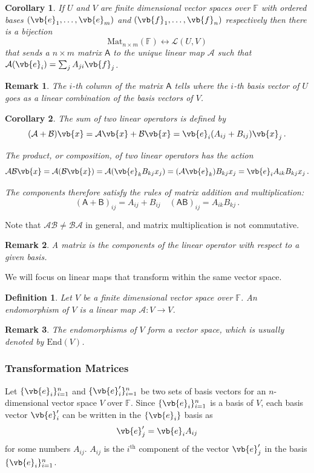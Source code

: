 \documentclass{article}
\theoremstyle{plain}\theoremheaderfont{\normalfont\itshape}\theorembodyfont{\rmfamily}\theoremseparator{.}\newtheorem*{rem}{Remark}\newtheorem*{ex}{Example}\newtheorem*{proof}{Proof}\newtheorem*{altp}{Alternative proof}
\theoremstyle{plain}\theoremheaderfont{\normalfont\bfseries}\theorembodyfont{\rmfamily}\theoremseparator{.}\newtheorem{thm}{Theorem}[section]\newtheorem{lem}[thm]{Lemma}\newtheorem{prop}[thm]{Proposition}\newtheorem*{cor}{Corollary}\newtheorem{defn}[thm]{Definition}\newtheorem{clm}[thm]{Claim}\newtheorem{clminproof}{Claim}
\theoremstyle{break}\theoremheaderfont{\normalfont\itshape}\theorembodyfont{\rmfamily}\theoremseparator{.\medskip}\newtheorem*{proofskip}{Proof}\newtheorem*{exs}{Examples}\newtheorem*{rems}{Remarks}
\theoremstyle{break}\theoremheaderfont{\normalfont\bfseries}\theorembodyfont{\rmfamily}\theoremseparator{.\medskip}\newtheorem{lemskip}[thm]{Lemma}\newtheorem{defnskip}[thm]{Definition}\newtheorem{propskip}[thm]{Proposition}\newtheorem{thmskip}[thm]{Theorem}
\numberwithin{equation}{section}
\begin{document}
	\begin{cor}
		If \(U\) and \(V\) are finite dimensional vector spaces over \(\mathbb{F}\) with ordered bases \((\vb{e}_1,\dots,\vb{e}_m)\) and \((\vb{f}_1,\dots,\vb{f}_n)\) respectively then there is a bijection
		\[\mathrm{Mat}_{n\times m}(\mathbb{F})\leftrightarrow \mathcal{L}(U,V)\]
		that sends a \(n\times m\) matrix \(\mathsf{A}\) to the unique linear map \(\mathcal{A}\) such that \(\mathcal{A}(\vb{e}_i) = \sum_j A_{ji}\vb{f}_j\).		
	\end{cor}
	\begin{rem}
		The \(i\)-th column of the matrix \(\mathsf{A}\) tells where the \(i\)-th basis vector of \(U\) goes as a linear combination of the basis vectors of \(V\).
	\end{rem}
	\begin{cor}
		The sum of two linear operators is defined by
		\[(\mathcal{A}+\mathcal{B})\vb{x}=\mathcal{A}\vb{x}+\mathcal{B}\vb{x}=\vb{e}_i(A_{ij}+B_{ij})\vb{x}_j\,.\]

		The product, or composition, of two linear operators has the action
		\[\mathcal{AB}\vb{x}=\mathcal{A}(\mathcal{B}\vb{x})=\mathcal{A}(\vb{e}_kB_{kj}x_j)=(\mathcal{A}\vb{e}_k)B_{kj}x_j=\vb{e}_iA_{ik}B_{kj}x_j\,.\]

		The components therefore satisfy the rules of matrix addition and multiplication:
		\[(\mathsf{A}+\mathsf{B})_{ij}=A_{ij}+B_{ij}\quad(\mathsf{AB})_{ij}=A_{ik}B_{kj}\,.\]
	\end{cor}
	Note that \(\mathcal{AB}\ne\mathcal{BA}\) in general, and matrix multiplication is not commutative.
	
	\begin{rem}
		A matrix is the components of the linear operator with respect to a given basis.
	\end{rem}

	We will focus on linear maps that transform within the same vector space.
	\begin{defn}
		Let \(V\) be a finite dimensional vector space over \(\mathbb{F}\). An \textit{endomorphism} of \(V\) is a linear map \(\mathcal{A}:V\to V\).
	\end{defn}
	\begin{rem}
		The endomorphisms of \(V\) form a vector space, which is usually denoted by \(\mathrm{End}(V)\).
	\end{rem}

	\subsubsection{Transformation Matrices}
	Let \(\{\vb{e}_i\}_{i=1}^n\) and \(\{\vb{e}'_i\}_{i=1}^n\) be two sets of basis vectors for an \(n\)-dimensional vector space \(V\) over \(\mathbb{F}\). Since \(\{\vb{e}_i\}_{i=1}^n\) is a basis of \(V\), each basis vector \(\vb{e}'_i\) can be written in the \(\{\vb{e}_i\}\) basis as
	\[\vb{e}'_j=\vb{e}_iA_{ij}\]
	for some numbers \(A_{ij}\). \(A_{ij}\) is the \(i^{\text{th}}\) component of the vector \(\vb{e}'_j\) in the basis \(\{\vb{e}_i\}_{i=1}^n\).
\end{document}
